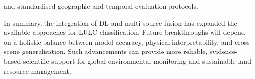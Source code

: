 \documentclass[]{interact}
\theoremstyle{plain}%
\theoremstyle{definition}
\theoremstyle{remark}
\DeclareRobustCommand{\DIFadd}[1]{{\protect\color{DIFaddcolor}\uwave{#1}}}
\DeclareRobustCommand{\DIFdel}[1]{{\protect\color{DIFdelcolor}\sout{#1}}}
\def\DIFadd#1{#1}%
\def\DIFdel#1{}%
\begin{document}
\DIFadd{and} \DIFadd{standardised} \DIFadd{geographic} \DIFadd{and} \DIFadd{temporal} \DIFadd{evaluation} \DIFadd{protocols}.

In summary, the integration of \DIFdel{deep} \DIFdel{learning} \DIFadd{DL} and multi-source fusion has \DIFdel{opened} \DIFdel{a} \DIFdel{new} \DIFdel{era} \DIFadd{expanded} \DIFadd{the} \DIFadd{available} \DIFadd{approaches} for LULC \DIFdel{research} \DIFadd{classification}. \DIFdel{While} \DIFdel{the} \DIFdel{field} \DIFdel{has} \DIFdel{made} \DIFdel{remarkable} \DIFdel{strides} \DIFdel{in} \DIFdel{technical} \DIFdel{complexity}\DIFdel{,} \DIFdel{future} \DIFadd{Future} breakthroughs will depend on a holistic balance between model accuracy, physical interpretability, and cross scene \DIFdel{generalization} \DIFadd{generalisation}. Such advancements \DIFdel{will} \DIFadd{can} provide more reliable, evidence-based scientific support for global environmental monitoring and sustainable land resource management.




\end{document}
